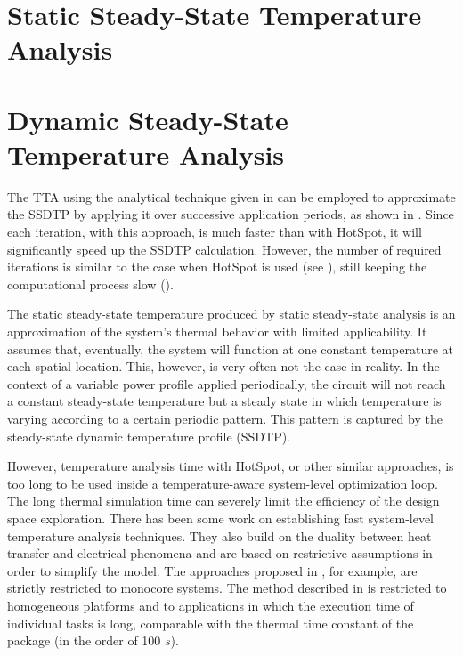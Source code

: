 \section{Static Steady-State Temperature Analysis}

\section{Dynamic Steady-State Temperature Analysis}

The TTA using the analytical technique given in  can
be employed to approximate the SSDTP by applying it over successive application
periods, as shown in . Since each iteration,
with this approach, is much faster than with HotSpot, it will significantly
speed up the SSDTP calculation. However, the number of required iterations is
similar to the case when HotSpot is used (see ), still
keeping the computational process slow ().

The static steady-state temperature produced by static steady-state analysis is
an approximation of the system's thermal behavior with limited applicability. It
assumes that, eventually, the system will function at one constant temperature
at each spatial location. This, however, is very often not the case in reality.
In the context of a variable power profile applied periodically, the circuit
will not reach a constant steady-state temperature but a steady state in which
temperature is varying according to a certain periodic pattern. This pattern is
captured by the steady-state dynamic temperature profile (SSDTP).

However, temperature analysis time with HotSpot, or other similar approaches, is
too long to be used inside a temperature-aware system-level optimization loop.
The long thermal simulation time can severely limit the efficiency of the design
space exploration. There has been some work on establishing fast system-level
temperature analysis techniques. They also build on the duality between heat
transfer and electrical phenomena and are based on restrictive assumptions in
order to simplify the model. The approaches proposed in \cite{rai2011, bao2010},
for example, are strictly restricted to monocore systems. The method described
in \cite{rao2009} is restricted to homogeneous platforms and to applications in
which the execution time of individual tasks is long, comparable with the
thermal time constant of the package (in the order of 100 $s$).

